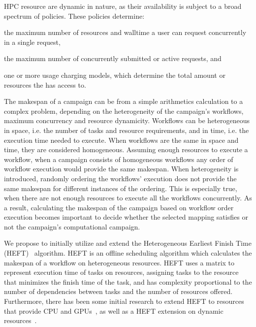 HPC resource are dynamic in nature, as their availability is subject to a broad spectrum of policies.
These policies determine:
\begin{inparaenum}[1)]
\item the maximum number of resources and walltime a user can request concurrently in a single request,
\item the maximum number of concurrently submitted or active requests, and
\item one or more usage charging models, which determine the total amount or resources the has access to.
\end{inparaenum}

The makespan of a campaign can be from a simple arithmetics calculation to a complex problem, depending on the heterogeneity of the campaign's workflows, maximum concurrency and resource dynamicity.
Workflows can be heterogeneous in space, i.e. the number of tasks and resource requirements, and in time, i.e. the execution time needed to execute.
When workflows are the same in space and time, they are considered homogeneous.
Assuming enough resources to execute a workflow, when a campaign consists of homogeneous workflows any order of workflow execution would provide the same makespan. 
When heterogeneity is introduced, randomly ordering the workflows' execution does not provide the same makespan for different instances of the ordering.
This is especially true, when there are not enough resources to execute all the workflows concurrently.
As a result, calculating the makespan of the campaign based on workflow order execution becomes important to decide whether the selected mapping satisfies or not the campaign's computational campaign.

We propose to initially utilize and extend the Heterogeneous Earliest Finish Time (HEFT)~\cite{topcuoglu2002performance} algorithm.
HEFT is an offline scheduling algorithm which calculates the makespan of a workflow on heterogeneous resources.
HEFT uses a matrix to represent execution time of tasks on resources, assigning tasks to the resource that minimizes the finish time of the task, and has complexity proportional to the number of dependencies between tasks and the number of resources offered.
Furthermore, there has been some initial research to extend HEFT to resources that provide CPU and GPUs~\cite{shetti2013optimization}, as well as a HEFT extension on dynamic resources~\cite{dong2007pfas}.

